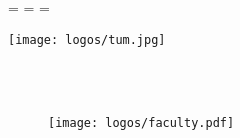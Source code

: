 \begin{titlepage}
  \oddsidemargin=\evensidemargin\relax
  \textwidth=\dimexpr{}\evensidemargin-2in\relax
  \hsize=\textwidth\relax

  
  \centering
  \vspace{40mm}
  \texttt{[image: logos/tum.jpg]}
  

  \vspace{10mm}
  {\huge\MakeUppercase{\getFaculty{}}}\\

  \vspace{5mm}
  {\large\MakeUppercase{\getUniversity{}}}\\

  \vspace{20mm}
  {\Large \getDoctype{}}
	
	\vspace{15mm}
  {\huge\bfseries \getTitle{}}

  \vspace{15mm}
  {\LARGE \getAuthor{}}

	\begin{figure}[h!]
	\centering
	\texttt{[image: logos/faculty.pdf]}
	\end{figure} 
\end{titlepage}
